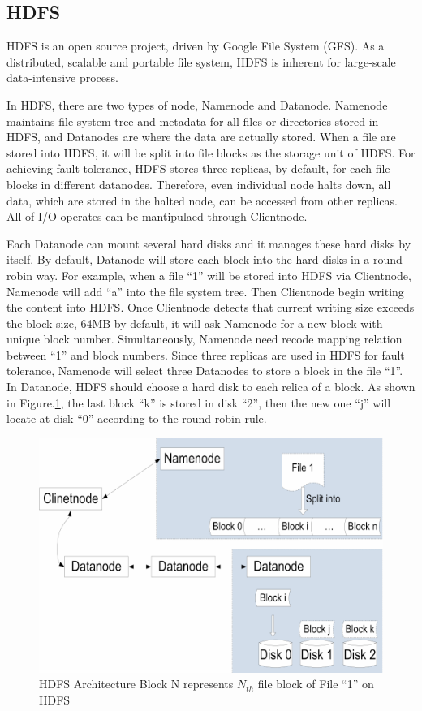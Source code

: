 \documentclass[preprint,12pt]{elsarticle}
\begin{document}
\subsection{HDFS}
HDFS\cite{borthakur2008hdfs} is an open source project, driven by Google File System (GFS)\cite{ghemawat2003google}. As a distributed, 
scalable and portable file system, HDFS is inherent for large-scale data-intensive process. \par
In HDFS, there are two types of node, Namenode and Datanode. Namenode maintains file system tree and metadata for all files or
directories stored in HDFS, and Datanodes are where the data are actually stored. When a file are stored into HDFS, it will be
split into file blocks as the storage unit of HDFS. For achieving fault-tolerance, HDFS stores three replicas, by default, for each
file blocks in different datanodes. Therefore, even individual node halts down, all data, which are stored in the halted node, can
be accessed from other replicas. All of I/O operates can be mantipulaed through Clientnode. \par
Each Datanode can mount several hard disks and it manages these hard disks by itself. By default, Datanode will store each block
into the hard disks in a round-robin way. For example, when a file ``1'' will be stored into HDFS via Clientnode, Namenode will add
``a'' into the file system tree. Then Clientnode begin writing the content into HDFS. Once Clientnode detects that current writing
size exceeds the block size, 64MB by default, it will ask Namenode for a new block with unique block number. Simultaneously,
Namenode need recode mapping relation between ``1'' and block numbers. Since three replicas are used in HDFS for fault tolerance,
Namenode will select three Datanodes to store a block in the file ``1''. In Datanode, HDFS should choose a hard disk to each relica 
of a block. As shown in Figure.\ref{figure1}, the last block ``k'' is stored in disk ``2'', then the new one ``j'' will locate at disk 
``0'' according to the round-robin rule. \par

\begin{figure}
	\centering
	\includegraphics{figure1}
	\caption{HDFS Architecture Block N represents $N_{th}$ file block of File ``1'' on HDFS}
	\label{figure1}
\end{figure}
\end{document}
